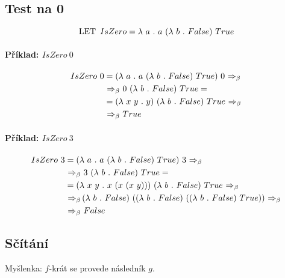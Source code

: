 \subsection{Test na 0}

$$ \lklet IsZero = \lk a \lkdot a ~ (\lk b \lkdot False) ~ True $$

\paragraph*{Příklad: $IsZero ~ 0$}
\begin{equation}
    \begin{split}
        IsZero ~ 0 &= (\lk a \lkdot a ~ (\lk b \lkdot False) ~ True) ~ 0 \lkbeta \\
        &\lkbeta 0 ~ (\lk b \lkdot False) ~ True = \\
        &= (\lk x ~ y \lkdot y) ~ (\lk b \lkdot False) ~ True \lkbeta \\
        &\lkbeta True
    \end{split}
\end{equation}

\paragraph*{Příklad: $IsZero ~ 3$}
\begin{equation}
    \begin{split}
        IsZero ~ 3 &= (\lk a \lkdot a ~ (\lk b \lkdot False) ~ True) ~ 3 \lkbeta \\
        &\lkbeta 3 ~ (\lk b \lkdot False) ~ True = \\
        &= (\lk x ~ y \lkdot x ~ (x ~ (x ~ y))) ~ (\lk b \lkdot False) ~ True \lkbeta \\
        &\lkbeta (\lk b \lkdot False) ~ ((\lk b \lkdot False) ~ ((\lk b \lkdot False) ~ True)) \lkbeta \\
        &\lkbeta False
    \end{split}
\end{equation}

\subsection{Sčítání}

\begin{compactitem}
    \item Myšlenka: $f$-krát se provede následník $g$.
\end{compactitem}

